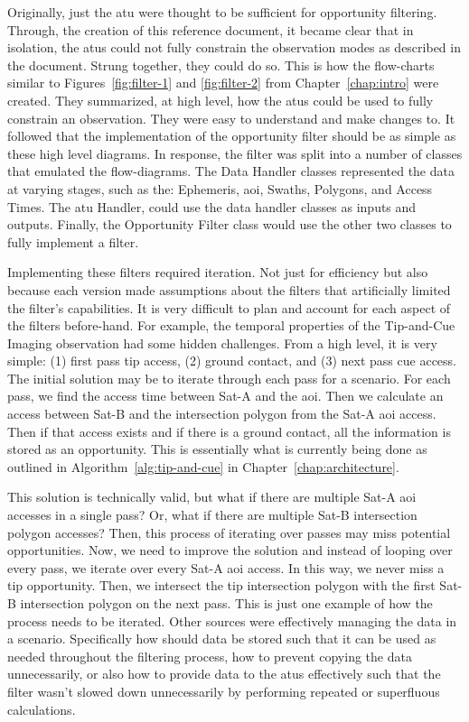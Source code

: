 Originally, just the \gls{atu} were thought to be sufficient for opportunity
filtering. Through, the creation of this reference document, it became clear
that in isolation, the \glspl{atu} could not fully constrain the observation
modes as described in the document. Strung together, they could do so.  This is
how the flow-charts similar to Figures~\ref{fig:filter-1} and
\ref{fig:filter-2} from Chapter~\ref{chap:intro} were created. They summarized,
at high level, how the \glspl{atu} could be used to fully constrain an
observation. They were easy to understand and make changes to. It followed that
the implementation of the opportunity filter should be as simple as these high
level diagrams. In response, the filter was split into a number of classes that
emulated the flow-diagrams. The Data Handler classes represented the data at
varying stages, such as the: Ephemeris, \gls{aoi}, Swaths, Polygons, and Access
Times. The \gls{atu} Handler, could use the data handler classes as inputs and
outputs. Finally, the Opportunity Filter class would use the other two classes
to fully implement a filter.  

Implementing these filters required iteration. Not just for efficiency but also
because each version made assumptions about the filters that artificially
limited the filter's capabilities.  It is very difficult to plan and account
for each aspect of the filters before-hand.  For example, the temporal
properties of the Tip-and-Cue Imaging observation had some hidden challenges.
From a high level, it is very simple: (1) first pass tip access, (2) ground
contact, and (3) next pass cue access. The initial solution may be to iterate
through each pass for a scenario. For each pass, we find the access time
between Sat-A and the \gls{aoi}. Then we calculate an access between Sat-B and
the intersection polygon from the Sat-A \gls{aoi} access. Then if that access
exists and if there is a ground contact, all the information is stored as an
opportunity. This is essentially what is currently being done as outlined in
Algorithm~\ref{alg:tip-and-cue} in Chapter~\ref{chap:architecture}.  

This solution is technically valid, but what if there are multiple Sat-A
\gls{aoi} accesses in a single pass? Or, what if there are multiple Sat-B
intersection polygon accesses? Then, this process of iterating over passes may
miss potential opportunities. Now, we need to improve the solution and instead
of looping over every pass, we iterate over every Sat-A \gls{aoi} access.  In
this way, we never miss a tip opportunity. Then, we intersect the tip
intersection polygon with the first Sat-B intersection polygon on the next
pass.  This is just one example of how the process needs to be iterated.  Other
sources were effectively managing the data in a scenario.  Specifically how
should data be stored such that it can be used as needed throughout the
filtering process, how to prevent copying the data unnecessarily, or also how
to provide data to the \glspl{atu} effectively such that the filter wasn't
slowed down unnecessarily by performing repeated or superfluous calculations.  

